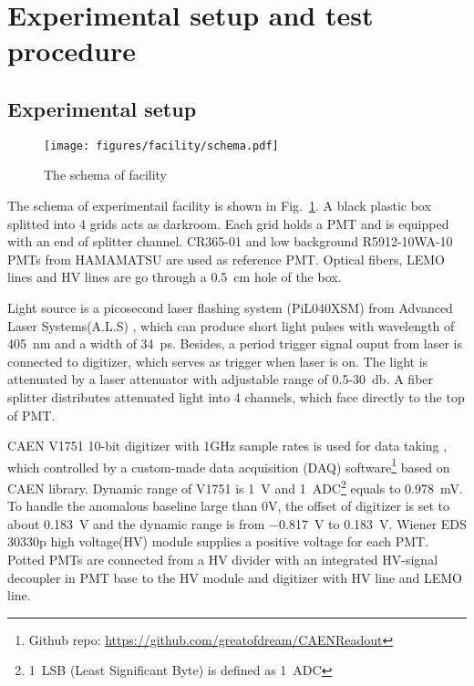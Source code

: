 \section{Experimental setup and test procedure}
\label{SetUp}
\subsection{Experimental setup}
\label{sec:setup}
\begin{figure}[!htbp]
    \centering
    \texttt{[image: figures/facility/schema.pdf]}
    \caption{The schema of facility}
    \label{fig:facility}
\end{figure}

The schema of experimentail facility is shown in Fig.~\ref{fig:facility}. A black plastic box splitted into 4 grids acts as darkroom. Each grid holds a PMT and is equipped with an end of splitter channel. CR365-01 \cite{BJBS} and low background R5912-10WA-10 \cite{JPBS} PMTs from HAMAMATSU are used as reference PMT. Optical fibers, LEMO lines and HV lines are go through a \SI{0.5}{cm} hole of the box.

Light source is a picosecond laser flashing system (PiL040XSM) from Advanced Laser Systems(A.L.S) \cite{NTKLaser}, which can produce short light pulses with wavelength of \SI{405}{nm} and a width of \SI{34}{ps}. Besides, a period trigger signal ouput from laser is connected to digitizer, which serves as trigger when laser is on. The light is attenuated by a laser attenuator with adjustable range of 0.5-30\ db. A fiber splitter %
distributes attenuated light into 4 channels, which face directly to the top of PMT.

CAEN V1751 10-bit digitizer with 1GHz sample rates is used for data taking \cite{CAENV1751}, which controlled by a custom-made data acquisition (DAQ) software\footnote{Github repo: \url{https://github.com/greatofdream/CAENReadout}} based on CAEN library. Dynamic range of V1751 is \SI{1}{V} and \SI{1}{ADC}\footnote{\SI{1}{LSB} (Least Significant Byte) is defined as \SI{1}{ADC}} equals to \SI{0.978}{mV}. To handle the anomalous baseline large than 0V, the offset of digitizer is set to about \SI{0.183}{V} and the dynamic range is from \SI{-0.817}{V} to \SI{0.183}{V}. Wiener EDS 30330p high voltage(HV) module \cite{WIENERHV} supplies a positive voltage for each PMT. Potted PMTs are connected from a HV divider with an integrated HV-signal decoupler in PMT base to the HV module and digitizer with HV line and LEMO line.

